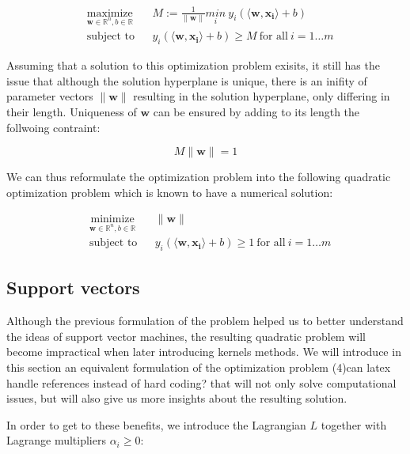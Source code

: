 \begin{equation}
  \begin{aligned}
    &\underset{\mathbf{w} \in \mathbb{R}^n, b \in \mathbb{R}} {\text{maximize}}
    & & M := \frac{1}{\|\mathbf{w}\|} \underset{i} {min}\ 
    y_i(\langle\mathbf{w},\mathbf{x_i}\rangle + b)\\
    &\text{subject to}
    & &y_i(\langle\mathbf{w},\mathbf{x_i}\rangle + b) \ge M\ \text{for all}\ i = 1 \dotsc m
  \end{aligned}
\end{equation}

Assuming that a solution to this optimization problem exisits, it still has the issue that although the solution hyperplane is unique, there is an inifity of parameter vectors $\|\mathbf{w}\|$ resulting in the solution hyperplane, only differing in their length. Uniqueness of $\mathbf{w}$ can be ensured by adding to its length the follwoing contraint:

$$M\|\mathbf{w}\| = 1$$

We can thus reformulate the optimization problem into the following quadratic optimization problem which is known to have a numerical solution:

\begin{equation}
  \begin{aligned}
    &\underset{\mathbf{w} \in \mathbb{R}^n, b \in \mathbb{R}} {\text{minimize}}
    & &\|\mathbf{w}\|\\
    &\text{subject to}
    & &y_i(\langle\mathbf{w},\mathbf{x_i}\rangle + b) \ge 1\ \text{for all}\ i = 1 \dotsc m
  \end{aligned}
\end{equation}

\subsection {Support vectors}

Although the previous formulation of the problem helped us to better understand the ideas of support vector machines, the resulting quadratic problem will become impractical when later introducing kernels methods. We will introduce in this section an equivalent formulation of the optimization problem (4)\textcolor[rgb]{1,0,0}{can latex handle references instead of hard coding?}
  that will not only solve computational issues, but will also give us more insights about the resulting solution.

In order to get to these benefits, we introduce the Lagrangian $L$ together with Lagrange multipliers $\alpha_i \ge 0$:

